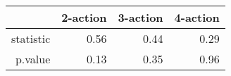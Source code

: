 \begin{table}[ht]
\centering
\begin{tabular}{rrrr}
  \hline
 & 2-action & 3-action & 4-action \\ 
  \hline
statistic & 0.56 & 0.44 & 0.29 \\ 
  p.value & 0.13 & 0.35 & 0.96 \\ 
   \hline
\end{tabular}
\end{table}
